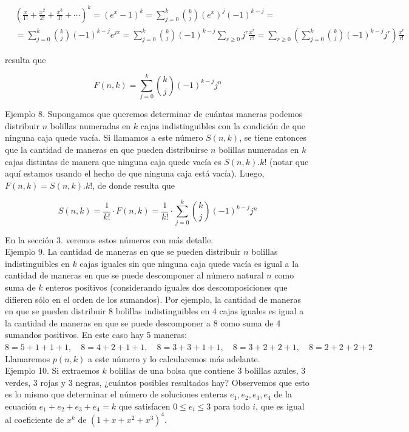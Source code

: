\documentclass[10pt]{article}
\begin{document}
$$
\begin{aligned}
& \left(\frac{x}{1!}+\frac{x^{2}}{2!}+\frac{x^{3}}{3!}+\cdots\right)^{k}=\left(e^{x}-1\right)^{k}=\sum_{j=0}^{k}\binom{k}{j}\left(e^{x}\right)^{j}(-1)^{k-j}= \\
& =\sum_{j=0}^{k}\binom{k}{j}(-1)^{k-j} e^{j x}=\sum_{j=0}^{k}\binom{k}{j}(-1)^{k-j} \sum_{r \geq 0} j^{r} \frac{x^{r}}{r!}=\sum_{r \geq 0}\left(\sum_{j=0}^{k}\binom{k}{j}(-1)^{k-j} j^{r}\right) \frac{x^{r}}{r!}
\end{aligned}
$$

resulta que

$$
F(n, k)=\sum_{j=0}^{k}\binom{k}{j}(-1)^{k-j} j^{n}
$$

Ejemplo 8. Supongamos que queremos determinar de cuántas maneras podemos distribuir $n$ bolillas numeradas en $k$ cajas indistinguibles con la condición de que ninguna caja quede vacía. Si llamamos a este número $S(n, k)$, se tiene entonces que la cantidad de maneras en que pueden distribuirse $n$ bolillas numeradas en $k$ cajas distintas de manera que ninguna caja quede vacía es $S(n, k) . k!$ (notar que aquí estamos usando el hecho de que ninguna caja está vacía). Luego, $F(n, k)=S(n, k) . k!$, de donde resulta que

$$
S(n, k)=\frac{1}{k!} \cdot F(n, k)=\frac{1}{k!} \cdot \sum_{j=0}^{k}\binom{k}{j}(-1)^{k-j} j^{n}
$$

En la sección 3. veremos estos números con más detalle.\\
Ejemplo 9. La cantidad de maneras en que se pueden distribuir $n$ bolillas indistinguibles en $k$ cajas iguales sin que ninguna caja quede vacía es igual a la cantidad de maneras en que se puede descomponer al número natural $n$ como suma de $k$ enteros positivos (considerando iguales dos descomposiciones que difieren sólo en el orden de los sumandos). Por ejemplo, la cantidad de maneras en que se pueden distribuir 8 bolillas indistinguibles en 4 cajas iguales es igual a la cantidad de maneras en que se puede descomponer a 8 como suma de 4 sumandos positivos. En este caso hay 5 maneras:\\
$8=5+1+1+1, \quad 8=4+2+1+1, \quad 8=3+3+1+1, \quad 8=3+2+2+1, \quad 8=2+2+2+2$\\
Llamaremos $p(n, k)$ a este número y lo calcularemos más adelante.\\
Ejemplo 10. Si extraemos $k$ bolillas de una bolsa que contiene 3 bolillas azules, 3 verdes, 3 rojas y 3 negras, ¿cuántos posibles resultados hay? Observemos que esto es lo mismo que determinar el número de soluciones enteras $e_{1}, e_{2}, e_{3}, e_{4}$ de la ecuación $e_{1}+e_{2}+e_{3}+e_{4}=k$ que satisfacen $0 \leq e_{i} \leq 3$ para todo $i$, que es igual al coeficiente de $x^{k}$ de $\left(1+x+x^{2}+x^{3}\right)^{4}$.
\end{document}
